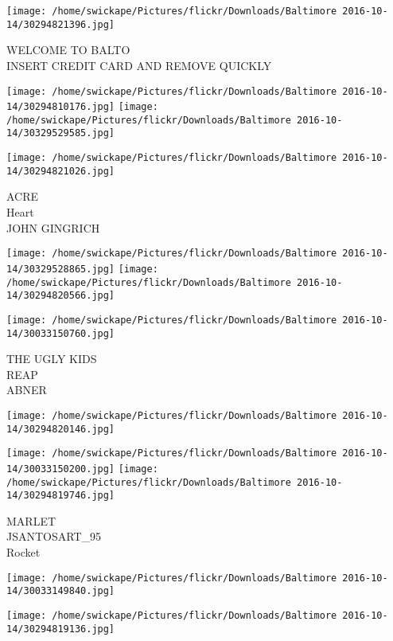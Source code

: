 \documentclass[10pt,letterpaper]{article}
\begin{document}
\vspace{0.25in}
\texttt{[image: /home/swickape/Pictures/flickr/Downloads/Baltimore 2016-10-14/30294821396.jpg]}

WELCOME TO BALTO\\
INSERT CREDIT CARD AND REMOVE QUICKLY
\pagebreak

\texttt{[image: /home/swickape/Pictures/flickr/Downloads/Baltimore 2016-10-14/30294810176.jpg]}
\texttt{[image: /home/swickape/Pictures/flickr/Downloads/Baltimore 2016-10-14/30329529585.jpg]}

\vspace{0.25in}
\texttt{[image: /home/swickape/Pictures/flickr/Downloads/Baltimore 2016-10-14/30294821026.jpg]}

ACRE\\
Heart\\
JOHN GINGRICH
\pagebreak

\texttt{[image: /home/swickape/Pictures/flickr/Downloads/Baltimore 2016-10-14/30329528865.jpg]}
\texttt{[image: /home/swickape/Pictures/flickr/Downloads/Baltimore 2016-10-14/30294820566.jpg]}

\vspace{0.25in}
\texttt{[image: /home/swickape/Pictures/flickr/Downloads/Baltimore 2016-10-14/30033150760.jpg]}

THE UGLY KIDS\\
REAP\\
ABNER
\pagebreak

\texttt{[image: /home/swickape/Pictures/flickr/Downloads/Baltimore 2016-10-14/30294820146.jpg]}

\vspace{0.25in}
\texttt{[image: /home/swickape/Pictures/flickr/Downloads/Baltimore 2016-10-14/30033150200.jpg]}
\texttt{[image: /home/swickape/Pictures/flickr/Downloads/Baltimore 2016-10-14/30294819746.jpg]}

MARLET\\
JSANTOSART\_95\\
Rocket
\pagebreak

\texttt{[image: /home/swickape/Pictures/flickr/Downloads/Baltimore 2016-10-14/30033149840.jpg]}

\vspace{0.25in}
\texttt{[image: /home/swickape/Pictures/flickr/Downloads/Baltimore 2016-10-14/30294819136.jpg]}
\end{document}
